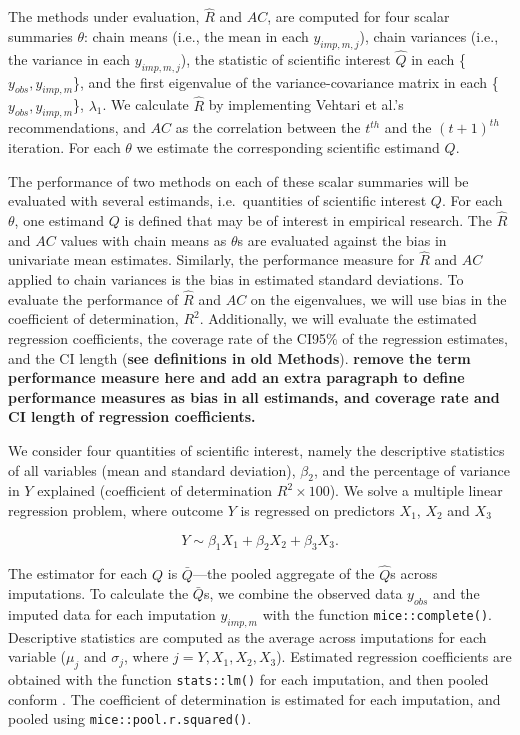 \documentclass[Royal,times,sageh]{sagej}
\begin{document}
The methods under evaluation, \(\widehat{R}\) and \(AC\), are computed
for four scalar summaries \(\theta\): chain means (i.e., the mean in
each \(y_{imp, m, j}\)), chain variances (i.e., the variance in each
\(y_{imp, m, j}\)), the statistic of scientific interest \(\hat{Q}\) in
each \{\(y_{obs}, y_{imp, m}\)\}, and the first eigenvalue of the
variance-covariance matrix in each \{\(y_{obs}, y_{imp, m}\)\},
\(\lambda_1\). We calculate \(\widehat{R}\) by implementing Vehtari et
al.'s \citeyearpar{veht19} recommendations, and \(AC\) as the
correlation between the \(t^{th}\) and the \((t+1)^{th}\) iteration. For
each \(\theta\) we estimate the corresponding scientific estimand \(Q\).

The performance of two methods on each of these scalar summaries will be
evaluated with several estimands, i.e.~quantities of scientific interest
\(Q\). For each \(\theta\), one estimand \(Q\) is defined that may be of
interest in empirical research. The \(\widehat{R}\) and \(AC\) values
with chain means as \(\theta\)s are evaluated against the bias in
univariate mean estimates. Similarly, the performance measure for
\(\widehat{R}\) and \(AC\) applied to chain variances is the bias in
estimated standard deviations. To evaluate the performance of
\(\widehat{R}\) and \(AC\) on the eigenvalues, we will use bias in the
coefficient of determination, \(R^2\). Additionally, we will evaluate
the estimated regression coefficients, the coverage rate of the CI95\%
of the regression estimates, and the CI length (\textbf{see definitions
in old Methods}). \textbf{remove the term performance measure here and
add an extra paragraph to define performance measures as bias in all
estimands, and coverage rate and CI length of regression coefficients.}

We consider four quantities of scientific interest, namely the
descriptive statistics of all variables (mean and standard deviation),
\(\beta_2\), and the percentage of variance in \(Y\) explained
(coefficient of determination \(R^2 \times 100\)). We solve a multiple
linear regression problem, where outcome \(Y\) is regressed on
predictors \(X_1\), \(X_2\) and \(X_3\)

\[Y \sim \beta_1 X_1 + \beta_2 X_2 + \beta_3 X_3.\]

The estimator for each \(Q\) is \(\bar{Q}\)---the pooled aggregate of
the \(\hat{Q}\)s across imputations. To calculate the \(\bar{Q}\)s, we
combine the observed data \(y_{obs}\) and the imputed data for each
imputation \(y_{imp,m}\) with the function \texttt{mice::complete()}.
Descriptive statistics are computed as the average across imputations
for each variable (\(\mu_j\) and \(\sigma_j\), where
\(j = Y, X_1, X_2, X_3\)). Estimated regression coefficients are
obtained with the function \texttt{stats::lm()} for each imputation, and
then pooled conform \citet{vink14}. The coefficient of determination is
estimated for each imputation, and pooled using
\texttt{mice::pool.r.squared()}.
\end{document}
